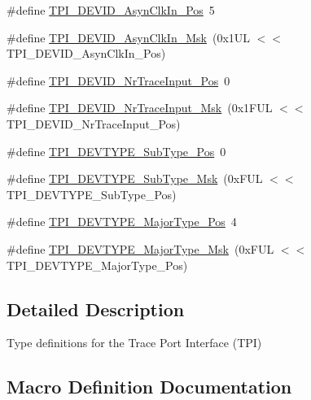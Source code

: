 \begin{DoxyCompactItemize}
\item 
\#define \mbox{\hyperlink{group___c_m_s_i_s___t_p_i_gab382b1296b5efd057be606eb8f768df8}{T\+P\+I\+\_\+\+D\+E\+V\+I\+D\+\_\+\+Asyn\+Clk\+In\+\_\+\+Pos}}~5
\item 
\#define \mbox{\hyperlink{group___c_m_s_i_s___t_p_i_gab67830557d2d10be882284275025a2d3}{T\+P\+I\+\_\+\+D\+E\+V\+I\+D\+\_\+\+Asyn\+Clk\+In\+\_\+\+Msk}}~(0x1\+U\+L $<$$<$ T\+P\+I\+\_\+\+D\+E\+V\+I\+D\+\_\+\+Asyn\+Clk\+In\+\_\+\+Pos)
\item 
\#define \mbox{\hyperlink{group___c_m_s_i_s___t_p_i_ga80ecae7fec479e80e583f545996868ed}{T\+P\+I\+\_\+\+D\+E\+V\+I\+D\+\_\+\+Nr\+Trace\+Input\+\_\+\+Pos}}~0
\item 
\#define \mbox{\hyperlink{group___c_m_s_i_s___t_p_i_gabed454418d2140043cd65ec899abd97f}{T\+P\+I\+\_\+\+D\+E\+V\+I\+D\+\_\+\+Nr\+Trace\+Input\+\_\+\+Msk}}~(0x1\+F\+U\+L $<$$<$ T\+P\+I\+\_\+\+D\+E\+V\+I\+D\+\_\+\+Nr\+Trace\+Input\+\_\+\+Pos)
\item 
\#define \mbox{\hyperlink{group___c_m_s_i_s___t_p_i_ga0c799ff892af5eb3162d152abc00af7a}{T\+P\+I\+\_\+\+D\+E\+V\+T\+Y\+P\+E\+\_\+\+Sub\+Type\+\_\+\+Pos}}~0
\item 
\#define \mbox{\hyperlink{group___c_m_s_i_s___t_p_i_ga5b2fd7dddaf5f64855d9c0696acd65c1}{T\+P\+I\+\_\+\+D\+E\+V\+T\+Y\+P\+E\+\_\+\+Sub\+Type\+\_\+\+Msk}}~(0x\+F\+U\+L $<$$<$ T\+P\+I\+\_\+\+D\+E\+V\+T\+Y\+P\+E\+\_\+\+Sub\+Type\+\_\+\+Pos)
\item 
\#define \mbox{\hyperlink{group___c_m_s_i_s___t_p_i_ga69c4892d332755a9f64c1680497cebdd}{T\+P\+I\+\_\+\+D\+E\+V\+T\+Y\+P\+E\+\_\+\+Major\+Type\+\_\+\+Pos}}~4
\item 
\#define \mbox{\hyperlink{group___c_m_s_i_s___t_p_i_gaecbceed6d08ec586403b37ad47b38c88}{T\+P\+I\+\_\+\+D\+E\+V\+T\+Y\+P\+E\+\_\+\+Major\+Type\+\_\+\+Msk}}~(0x\+F\+U\+L $<$$<$ T\+P\+I\+\_\+\+D\+E\+V\+T\+Y\+P\+E\+\_\+\+Major\+Type\+\_\+\+Pos)
\end{DoxyCompactItemize}


\subsection{Detailed Description}
Type definitions for the Trace Port Interface (T\+PI) 



\subsection{Macro Definition Documentation}
\mbox{\label{group___c_m_s_i_s___t_p_i_ga4fcacd27208419929921aec8457a8c13}} 
